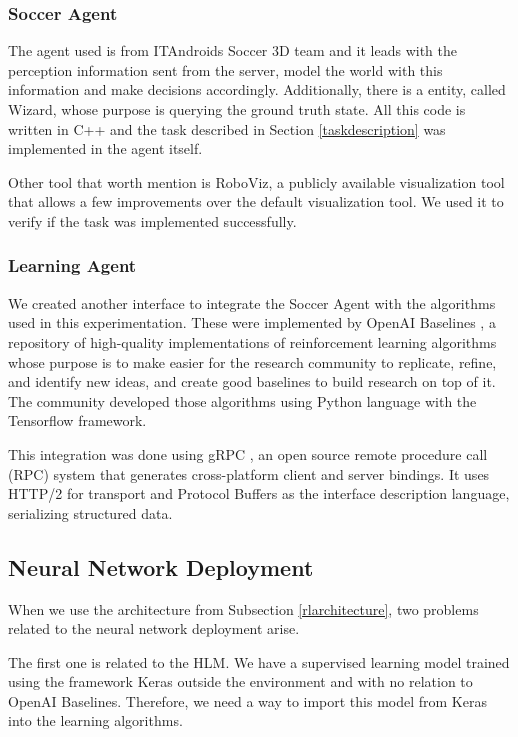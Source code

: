 \subsubsection{Soccer Agent}
The agent used is from ITAndroids Soccer 3D team and it leads with the perception information sent from the server, model the world with this information and make decisions accordingly. Additionally, there is a entity, called Wizard, whose purpose is querying the ground truth state. All this code is written in C++ and the task described in Section \ref{taskdescription} was implemented in the agent itself.

Other tool that worth mention is RoboViz, a publicly available visualization tool that allows a few improvements over the default visualization tool. We used it to verify if the task was implemented successfully.

\subsubsection{Learning Agent}\label{learningagent}

We created another interface to integrate the Soccer Agent with the algorithms used in this experimentation. These were implemented by OpenAI Baselines \cite{baselines}, a repository of high-quality implementations of reinforcement learning algorithms whose purpose is to make easier for the research community to replicate, refine, and identify new ideas, and create good baselines to build research on top of it. The community developed those algorithms using Python language with the Tensorflow \cite{tensorflow2015-whitepaper} framework.

This integration was done using gRPC \cite{grpc}, an open source remote procedure call (RPC) system that generates cross-platform client and server bindings. It uses HTTP/2 for transport and Protocol Buffers \cite{protocolbuffers} as the interface description language, serializing structured data.




\subsection{Neural Network Deployment}

When we use the architecture from Subsection \ref{rlarchitecture}, two problems related to the neural network deployment arise.

The first one is related to the HLM. We have a supervised learning model trained using the framework Keras outside the environment and with no relation to OpenAI Baselines. Therefore, we need a way to import this model from Keras into the learning algorithms.

